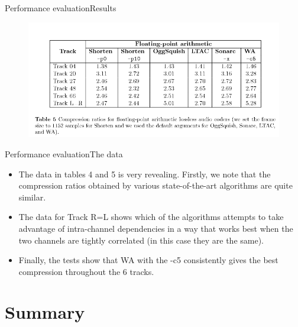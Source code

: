 \documentclass{beamer}
\begin{document}
\begin{frame}{Performance evaluation}{Results}
	\begin{figure}
		\includegraphics[scale=0.35]{results3.png}
	\end{figure} 
\end{frame}

\begin{frame}{Performance evaluation}{The data}
	\begin{itemize}[<+->]
		\item{
			The data in tables 4 and 5 is very revealing. Firstly, we note that the compression ratios obtained by various state-of-the-art algorithms are quite similar.
		}
		\item{
			The data for Track R=L shows which of the algorithms attempts to take advantage of intra-channel dependencies in a way that works best when the two channels are tightly correlated (in this case they are the same).
		}
		\item{
			Finally, the tests show that WA with the -c5 consistently gives the best compression throughout the 6 tracks.
		}
	\end{itemize}
\end{frame}

\section*{Summary}
\end{document}
